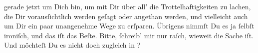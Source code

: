                gerade jetzt um Dich bin, um {\pb}mit Dir über all’ die
               Trottelhaftigkeiten zu lachen, die Dir vorausſichtlich werden geſagt oder angethan
               werden, und vielleicht auch um Dir ein paar unangenehme Wege zu erſparen. Übrigens
               nimmſt Du es ja{ }ſelbſt ironiſch, und das iſt das Beſte. Bitte,{ }ſchreib’ mir nur
               raſch, wieweit die Sache iſt.
               Und möchteſt Du es nicht doch zugleich in \label{K_L02620-3v}\label{K_L02620-3}?\pend
           
